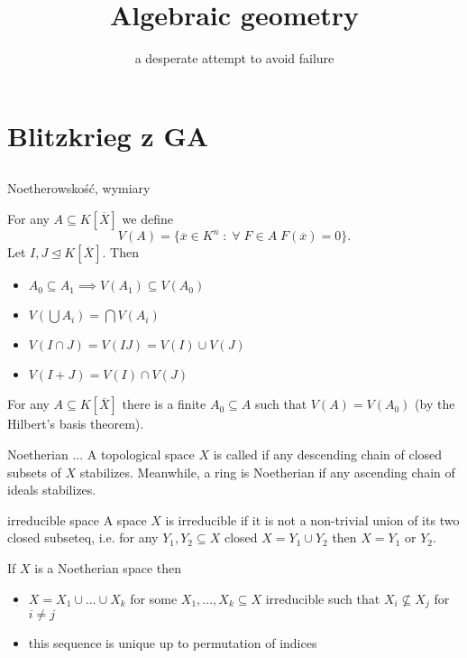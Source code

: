 \documentclass[twoside, a4paper, 12pt]{book}
\title{Algebraic geometry}
\author{\color{subtext1}a desperate attempt to avoid failure}
\date{}
\begin{document}
\frontmatter 
\maketitle
\thispagestyle{empty}
\setcounter{page}{0}
%

\mainmatter

\pagestyle{fancy}

 
%  


% 
%
% 

\chapter{Blitzkrieg z GA}

\section{}{Noetherowskość, wymiary}

For any $A\subseteq K[\overline{X}]$ we define
$$V(A)=\{\overline{x}\in K^n\;:\;\forall\;F\in A\;F(\overline{x})=0\}.$$
Let $I,J\trianglelefteq K[\overline{X}]$. Then
\begin{itemize}
  \item $A_0\subseteq A_1\implies V(A_1)\subseteq V(A_0)$
  \item $V(\bigcup A_i)=\bigcap V(A_i)$
  \item $V(I\cap J)=V(IJ)=V(I)\cup V(J)$
  \item $V(I+J)=V(I)\cap V(J)$
\end{itemize}

For any $A\subseteq K[\overline{X}]$ there is a finite $A_0\subseteq A$ such that $V(A)=V(A_0)$ (by the Hilbert's basis theorem).

\begin{definition}{Noetherian ...}{}
  A topological space $X$ is called  if any descending chain of closed subsets of $X$ stabilizes. Meanwhile, a ring is Noetherian if any ascending chain of ideals stabilizes.
\end{definition}

\begin{definition}{irreducible space}{}
  A space $X$ is irreducible if it is not a non-trivial union of its two closed subseteq, i.e. for any $Y_1,Y_2\subseteq X$ closed $X=Y_1\cup Y_2$ then $X=Y_1$ or $Y_2$.
\end{definition}

If $X$ is a Noetherian space then
\begin{itemize}
  \item $X=X_1\cup...\cup X_k$ for some $X_1,...,X_k\subseteq X$ irreducible such that $X_i\not\subseteq X_j$ for $i\neq j$
  \item this sequence is unique up to permutation of indices
\end{itemize}
\end{document}
